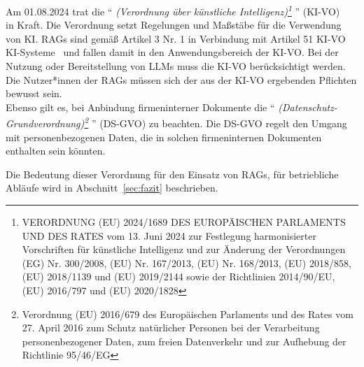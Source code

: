 Am 01.08.2024 trat die
\enquote{\textit{
    (Verordnung über künstliche Intelligenz)\footnote{VERORDNUNG (EU) 2024/1689 DES EUROPÄISCHEN PARLAMENTS UND DES RATES vom 13. Juni 2024 zur Festlegung harmonisierter Vorschriften für künstliche Intelligenz und zur Änderung der Verordnungen (EG) Nr. 300/2008, (EU) Nr. 167/2013, (EU) Nr. 168/2013, (EU) 2018/858, (EU) 2018/1139 und (EU) 2019/2144 sowie der Richtlinien 2014/90/EU, (EU) 2016/797 und (EU) 2020/1828}
    }} (KI-VO)~\cite{european_commission_ai_act}\\
in Kraft.
Die Verordnung setzt Regelungen und Maßstäbe für die Verwendung von KI.
RAGs sind gemäß Artikel 3 Nr. 1 in Verbindung mit Artikel 51 KI-VO KI-Systeme~\cite{Martini2024KIVO} und fallen damit in den Anwendungsbereich der KI-VO.
Bei der Nutzung oder Bereitstellung von LLMs muss die KI-VO berücksichtigt werden.
Die Nutzer*innen der RAGs müssen sich der aus der KI-VO ergebenden Pflichten bewusst sein.\\
Ebenso gilt es, bei Anbindung firmeninterner Dokumente die
\enquote{\textit{
    (Datenschutz-Grundverordnung)\footnote{Verordnung (EU) 2016/679 des Europäischen Parlaments und des Rates vom 27. April 2016 zum Schutz natürlicher Personen bei der Verarbeitung personenbezogener Daten, zum freien Datenverkehr und zur Aufhebung der Richtlinie 95/46/EG}
    }} (DS-GVO) zu beachten.
Die DS-GVO regelt den Umgang mit personenbezogenen Daten, die in solchen firmeninternen Dokumenten enthalten sein könnten.

Die Bedeutung dieser Verordnung für den Einsatz von RAGs, für betriebliche Abläufe wird in Abschnitt~\ref{sec:fazit} beschrieben.